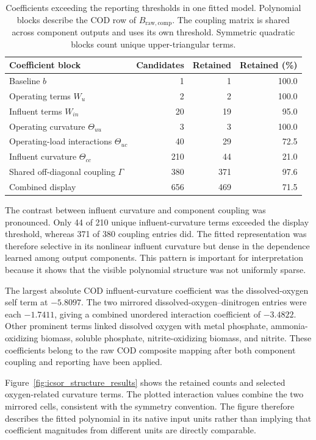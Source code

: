 \begin{table}[htbp]
\centering\small
\caption{Coefficients exceeding the reporting thresholds in one fitted model. Polynomial blocks describe the COD row of $B_{\mathrm{raw,comp}}$. The coupling matrix is shared across component outputs and uses its own threshold. Symmetric quadratic blocks count unique upper-triangular terms.}
\label{tab:icsor_coefficient_results}
\begin{tabular}{p{6.2cm}rrr}
\toprule
Coefficient block & Candidates & Retained & Retained (\%)\\
\midrule
Baseline $b$ & 1 & 1 & 100.0\\
Operating terms $W_u$ & 2 & 2 & 100.0\\
Influent terms $W_{in}$ & 20 & 19 & 95.0\\
Operating curvature $\Theta_{uu}$ & 3 & 3 & 100.0\\
Operating-load interactions $\Theta_{uc}$ & 40 & 29 & 72.5\\
Influent curvature $\Theta_{cc}$ & 210 & 44 & 21.0\\
Shared off-diagonal coupling $\Gamma$ & 380 & 371 & 97.6\\
Combined display & 656 & 469 & 71.5\\
\bottomrule
\end{tabular}
\end{table}

The contrast between influent curvature and component coupling was pronounced. Only 44 of 210 unique influent-curvature terms exceeded the display threshold, whereas 371 of 380 coupling entries did. The fitted representation was therefore selective in its nonlinear influent curvature but dense in the dependence learned among output components. This pattern is important for interpretation because it shows that the visible polynomial structure was not uniformly sparse.

The largest absolute COD influent-curvature coefficient was the dissolved-oxygen self term at \(-5.8097\). The two mirrored dissolved-oxygen--dinitrogen entries were each \(-1.7411\), giving a combined unordered interaction coefficient of \(-3.4822\). Other prominent terms linked dissolved oxygen with metal phosphate, ammonia-oxidizing biomass, soluble phosphate, nitrite-oxidizing biomass, and nitrite. These coefficients belong to the raw COD composite mapping after both component coupling and reporting have been applied.

Figure~\ref{fig:icsor_structure_results} shows the retained counts and selected oxygen-related curvature terms. The plotted interaction values combine the two mirrored cells, consistent with the symmetry convention. The figure therefore describes the fitted polynomial in its native input units rather than implying that coefficient magnitudes from different units are directly comparable.

